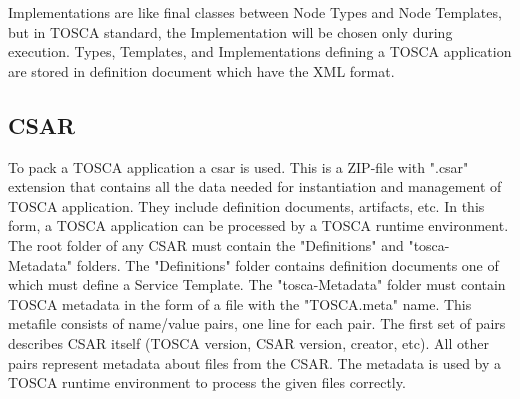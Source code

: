 Implementations are like final classes between Node Types and Node Templates, but in TOSCA standard, the Implementation will be chosen only during execution.
Types, Templates, and Implementations defining a TOSCA application are stored in definition document which have the XML format. %

%
\subsection*{CSAR} 
%
To pack a TOSCA application a \gls{csar}\label{sec:csar} is used.
This is a ZIP-file with ".csar" extension that contains all the data needed for instantiation and management of TOSCA application.
They include definition documents, artifacts, etc.
In this form, a TOSCA application can be processed by a TOSCA runtime environment.\\
The root folder of any CSAR must contain the "Definitions" and "\gls{tosca}-Metadata" folders.
The "Definitions" folder contains definition documents one of which must define a Service Template.
The "\gls{tosca}-Metadata" folder must contain TOSCA metadata in the form of a file with the "TOSCA.meta" name.
This metafile consists of name/value pairs, one line for each pair. 
The first set of pairs describes CSAR itself (TOSCA version, CSAR version, creator, etc). 
All other pairs represent metadata about files from the CSAR. 
The metadata is used by a TOSCA runtime environment to process the given files correctly.\\
%

